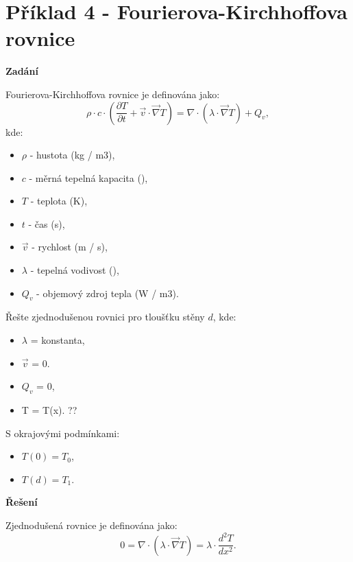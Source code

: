 \documentclass{article}
\begin{document}
\maketitle
\tableofcontents
\newpage



\section*{Příklad 4 - Fourierova-Kirchhoffova rovnice}

\textbf{Zadání}

Fourierova-Kirchhoffova rovnice je definována jako:
\begin{equation}
    \rho \cdot c \cdot \left( \frac{\partial T}{\partial t} + \vec{v} \cdot \vec{\nabla} T \right) = \nabla \cdot \left( \lambda \cdot \vec{\nabla} T \right) + Q_v,
\end{equation}
kde:
\begin{itemize}
    \item $\rho$ - hustota (kg / m3),
    \item $c$ - měrná tepelná kapacita (\ueqJandKGinvKinv),
    \item $T$ - teplota (K),
    \item $t$ - čas (s),
    \item $\vec{v}$ - rychlost (m / s),
    \item $\lambda$ - tepelná vodivost (\ueqJandKGinvKinv),
    \item $Q_v$ - objemový zdroj tepla (W / m3).
\end{itemize}

Řešte zjednodušenou rovnici pro tloušťku stěny $d$, kde:

\begin{itemize}
    \item $\lambda$ = konstanta,
    \item $\vec{v}$ = 0.
    \item $Q_v$ = 0,
    \item T = T(x). ??
\end{itemize}

S okrajovými podmínkami:
\begin{itemize}
    \item $T(0) = T_0$,
    \item $T(d) = T_1$.
\end{itemize}

\textbf{Řešení}

Zjednodušená rovnice je definována jako:
$$
    0 = \nabla \cdot \left( \lambda \cdot \vec{\nabla} T \right) = \lambda \cdot \frac{d^2 T}{d x^2}.
$$
\end{document}

